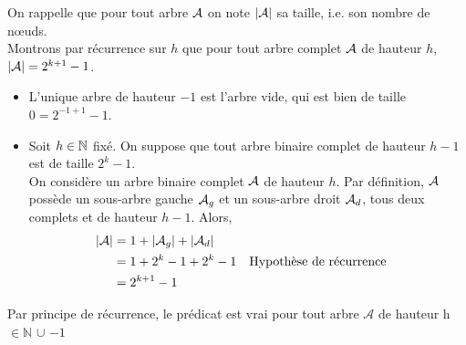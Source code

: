 \begin{demonstration}
    On rappelle que pour tout arbre $\mathcal{A}$ on note $|\mathcal{A}|$ sa taille, i.e. son nombre de nœuds. \\ Montrons par récurrence sur $h$ que pour tout arbre complet $\mathcal{A}$ de hauteur $h$, $|\mathcal{A}| = 2^{k+1} - 1$. \begin{itemize}
        \item L'unique arbre de hauteur $-1$ est l'arbre vide, qui est bien de taille $0 = 2^{-1+1} - 1$.
        \item Soit $h \in \mathbb{N}$ fixé. On suppose que tout arbre binaire complet de hauteur $h-1$ est de taille $2^k - 1$. \\ On considère un arbre binaire complet $\mathcal{A}$ de hauteur $h$. Par définition, $\mathcal{A}$ possède un sous-arbre gauche $\mathcal{A}_g$ et un sous-arbre droit $\mathcal{A}_d$, tous deux complets et de hauteur $h-1$. Alors, \begin{align*}
            |\mathcal{A}| &= 1 + |\mathcal{A}_g| + |\mathcal{A}_d| \\
            &= 1 + 2^k -1 + 2^k - 1 &&\text{Hypothèse de récurrence} \\
            &= 2^{k+1} - 1
        \end{align*}
    \end{itemize}
    Par principe de récurrence, le prédicat est vrai pour tout arbre $\mathcal{A}$ de hauteur h $\in \mathbb{N}$ $\cup$ {$-1$}
\end{demonstration}

